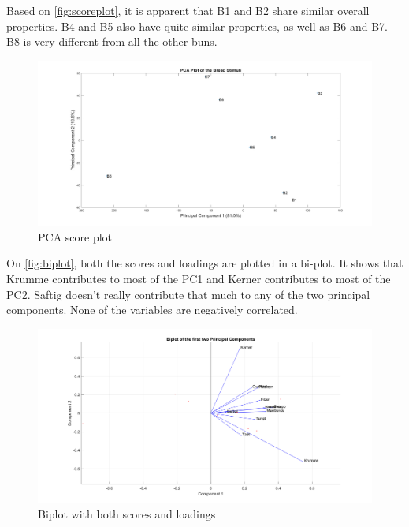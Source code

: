 
Based on \autoref{fig:scoreplot}, it is apparent that B1 and B2 share similar overall properties. B4 and B5 also have quite similar properties, as well as B6 and B7. B8 is very different from all the other buns.
\begin{figure}[H]
\centering
\includegraphics[width =\textwidth]{Figure/PCA_plot}
\caption{PCA score plot}
\label{fig:scoreplot}
\end{figure}
\noindent

On \autoref{fig:biplot}, both the scores and loadings are plotted in a bi-plot. It shows that Krumme contributes to most of the PC1 and Kerner contributes to most of the PC2. Saftig doesn't really contribute that much to any of the two principal components.
None of the variables are negatively correlated. 

\begin{figure}[H]
\centering
\includegraphics[width =\textwidth]{Figure/biplot}
\caption{Biplot with both scores and loadings}
\label{fig:biplot}
\end{figure}
\noindent


